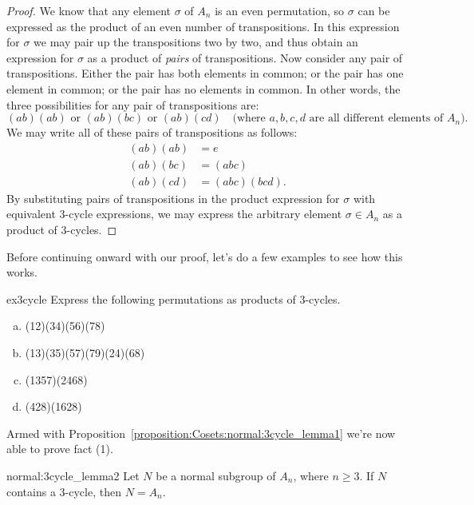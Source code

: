\begin{proof}
We know that any element $\sigma$ of $A_n$ is an even permutation, so $\sigma$ can be expressed as the product of an even number of transpositions. In this  expression for $\sigma$ we may pair up the transpositions two by two, and thus obtain an expression for $\sigma$ as a product of \emph{pairs} of transpositions. Now consider any pair of transpositions. Either the pair has both elements in common; or the pair has one element in common; or the pair has no elements in common. In other words, the three possibilities for any pair of transpositions are:
\[ (ab)(ab) \text{ or } (ab)(bc)  \text{ or } (ab)(cd) \quad \text{(where } a,b,c,d \text{ are all different elements of } A_n).\]
We may write all of these pairs of transpositions as follows:
\begin{align*}
(ab)(ab) & = e \\
(ab)(bc) & = (abc) \\
(ab)(cd) & = (abc)(bcd).
\end{align*}
By substituting pairs of transpositions in the product expression for $\sigma$ with equivalent 3-cycle expressions, we may express the arbitrary element $\sigma \in A_n$ as a product of 3-cycles.
\end{proof}

Before continuing onward with our proof, let's do a few examples to see how this works.

 \begin{exercise}{ex3cycle}
 Express the following permutations as products of 3-cycles.
\begin{enumerate}[(a)]
\item 
(12)(34)(56)(78)
\item 
(13)(35)(57)(79)(24)(68)
\item 
(1357)(2468)
\item 
(428)(1628)
\end{enumerate}
 \end{exercise}
Armed with Proposition~\ref{proposition:Cosets:normal:3cycle_lemma1} we're now able to prove fact (1).

\begin{prop}{normal:3cycle_lemma2}
Let $N$ be a  normal subgroup of $A_n$, where $n \geq 3$. If $N$ 
contains a $3$-cycle, then $N = A_n$. 
\end{prop}
 
